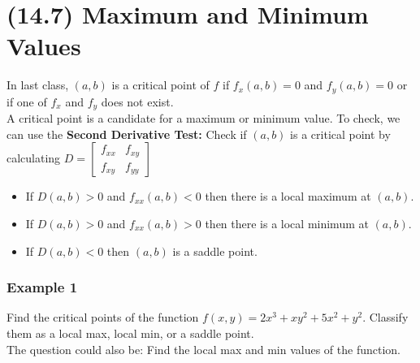 \documentclass{article}
\begin{document}
\section{(14.7) Maximum and Minimum Values}
In last class, $(a,b)$ is a critical point of $f$ if $f_x(a,b)=0$ and $f_y(a,b)=0$ or if one of $f_x$ and $f_y$ does not exist.
\\A critical point is a candidate for a maximum or minimum value. To check, we can use the \textbf{Second Derivative Test:}
Check if $(a,b)$ is a critical point by calculating $D=\begin{bmatrix}
    f_{xx} & f_{xy} \\
    f_{xy} & f_{yy}
\end{bmatrix}$
\begin{itemize}
    \itemsep 0em
    \item If $D(a,b)>0$ and $f_{xx}(a,b)<0$ then there is a local maximum at $(a,b)$.
    \item If $D(a,b)>0$ and $f_{xx}(a,b)>0$ then there is a local minimum at $(a,b)$.
    \item If $D(a,b)<0$ then $(a,b)$ is a saddle point.
\end{itemize}

\subsubsection{Example 1}
Find the critical points of the function $f(x,y)=2x^3+xy^2+5x^2+y^2$. Classify them as a local max, local min, or a saddle point.
\\The question could also be: Find the local max and min values of the function.
\end{document}
